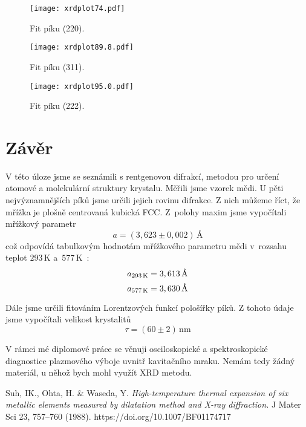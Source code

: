 \documentclass[a4paper,12pt]{article}
\begin{document}
\begin{figure}[h!]
\centering
\texttt{[image: xrdplot74.pdf]}
\caption{\centering Fit píku (220).}
\label{fig:74}
\end{figure}

\begin{figure}[h!]
\centering
\texttt{[image: xrdplot89.8.pdf]}
\caption{\centering Fit píku (311).}
\label{fig:90}
\end{figure}
	
\begin{figure}[h!]
	\centering
	\texttt{[image: xrdplot95.0.pdf]}
	\caption{\centering Fit píku (222).}
	\label{fig:95}
\end{figure}
\clearpage
\section{Závěr}\noindent
V této úloze jsme se seznámili s rentgenovou difrakcí, metodou pro určení 
atomové a molekulární struktury krystalu. Měřili jsme vzorek mědi. U pěti 
nejvýznamnějších píků jsme určili jejich rovinu difrakce. Z nich můžeme říct, 
že mřížka je plošně centrovaná kubická FCC. Z~polohy maxim jsme vypočítali 
mřížkový parametr $$a = (3,623\pm0,002)\,\si{\angstrom}$$ což odpovídá 
tabulkovým hodnotám mřížkového parametru mědi v~rozsahu teplot 
$293\,\si{\kelvin}$ 
a~$577\,\si{\kelvin}$~\cite{cod}:
$$a_{\text{293\,\si{\kelvin}}} = 3,613\,\si{\angstrom}$$
$$a_{\text{577\,\si{\kelvin}}} = 3,630\,\si{\angstrom}$$ 

Dále jsme určili fitováním Lorentzových funkcí pološířky píků. Z tohoto údaje 
jsme vypočítali velikost krystalitů $$\tau = (60 \pm 2)\,\si{\nano\meter}$$

V rámci mé diplomové práce se věnuji osciloskopické a spektroskopické 
diagnostice plaz\-mo\-vé\-ho výboje uvnitř kavitačního mraku. Nemám tedy žádný 
materiál, u něhož bych mohl využít XRD metodu.
	
\begin{thebibliography}{10}
	 Suh, IK., Ohta, H. \& Waseda, Y. \textit{High-temperature 
	thermal expansion of six metallic elements measured by dilatation method 
	and X-ray diffraction.} J Mater Sci 23, 757–760 (1988). 
	https://doi.org/10.1007/BF01174717
\end{thebibliography}
	
\end{document}
